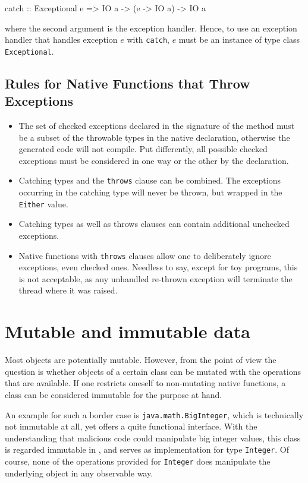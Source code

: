 \begin{code}
catch :: Exceptional e => IO a -> (e -> IO a) -> IO a
\end{code}

where the second argument is the exception handler. Hence, to use an exception handler that handles exception $e$ with \texttt{catch}, $e$ must be an instance of type class \texttt{Exceptional}.

\subsection*{Rules for Native Functions that Throw Exceptions}

\begin{itemize}
\item The set of checked exceptions declared in the signature of the \java{} method must be a subset of the throwable types in the native declaration, otherwise the generated \java{} code will not compile. Put differently, 
all possible checked exceptions must be considered in one way or the other by the \frege{} declaration.
\item Catching types and the \texttt{throws} clause can be combined. The exceptions occurring in the catching type will never be thrown, but wrapped in the \texttt{Either} value.
\item Catching types as well as throws clauses can contain additional unchecked exceptions.
\item Native functions with \texttt{throws} clauses allow one to deliberately ignore exceptions, even checked ones.
Needless to say, except for toy programs, this is not acceptable, as 
any unhandled re-thrown exception will terminate the thread where it was raised.
\end{itemize}

\section{Mutable and immutable \java{} data}

Most \java{} objects are potentially mutable. 
However, from the \frege{} point of view the question is whether objects of a certain class can be mutated with the operations that are available. If one restricts oneself to non-mutating native functions, 
a \java{} class can be considered immutable for the purpose at hand. 

An example for such a border case is \texttt{java.math.BigInteger}, which is technically not immutable at all, 
yet offers a quite functional interface. 
With the understanding that malicious \java{} code could manipulate big integer values, 
this class is regarded immutable in \frege{}, and serves as implementation for type \texttt{Integer}. Of course, none of the
operations provided for \texttt{Integer} does manipulate the underlying \java{} object in any observable way.


